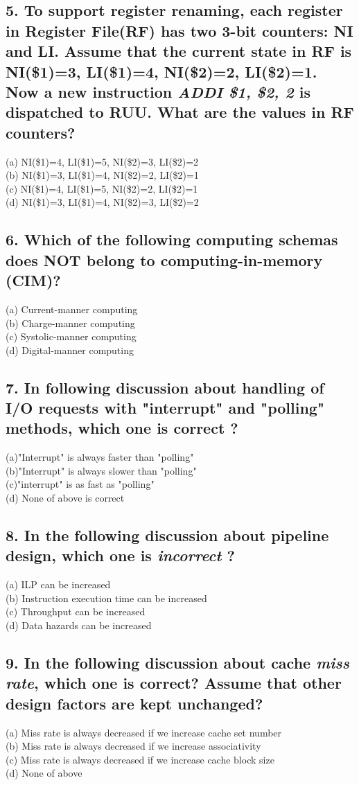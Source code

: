 \documentclass[UTF8]{ctexart}
\begin{document}
\subsection*{5. To support register renaming, each register in Register File(RF) has two 3-bit counters: NI and LI. Assume that the current state in RF is 
NI(\$1)=3, LI(\$1)=4, NI(\$2)=2, LI(\$2)=1. Now a new instruction {\bfseries\textit{ADDI \$1, \$2, 2}} is dispatched to RUU. What are the values in RF counters?}
(a) NI(\$1)=4, LI(\$1)=5, NI(\$2)=3, LI(\$2)=2\\
(b) NI(\$1)=3, LI(\$1)=4, NI(\$2)=2, LI(\$2)=1\\
(c) NI(\$1)=4, LI(\$1)=5, NI(\$2)=2, LI(\$2)=1\\
(d) NI(\$1)=3, LI(\$1)=4, NI(\$2)=3, LI(\$2)=2\\
\subsection*{6. Which of the following computing schemas does NOT belong to computing-in-memory (CIM)?}
(a) Current-manner computing\\
(b) Charge-manner computing\\
(c) Systolic-manner computing\\
(d) Digital-manner computing\\
\subsection*{7. In following discussion about handling of I/O requests with "interrupt" and "polling" methods, which one is correct ?}
(a)"Interrupt" is always faster than "polling"\\
(b)"Interrupt" is always slower than "polling"\\
(c)"interrupt" is as fast as "polling"\\
(d) None of above is correct\\ 
\subsection*{8. In the following discussion about pipeline design, which one is {\bfseries\textit{incorrect}} ?}
(a) ILP can be increased\\
(b) Instruction execution time can be increased\\
(c) Throughput can be increased\\
(d) Data hazards can be increased\\
\subsection*{9. In the following discussion about cache {\bfseries\textit{miss rate}}, which one is correct? Assume that other design factors are kept unchanged? }
(a) Miss rate is always decreased if we increase cache set number\\
(b) Miss rate is always decreased if we increase associativity\\
(c) Miss rate is always decreased if we increase cache block size\\
(d) None of above\\
\end{document}
